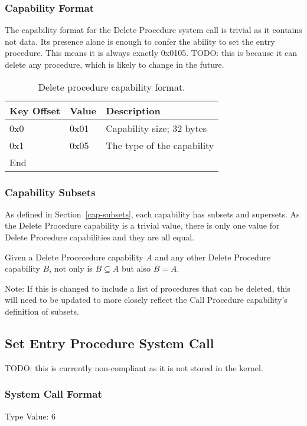\documentclass[english,a4paper]{article}
\let\oldparagraph\subsubsection
\renewcommand{\subsubsection}[1]{\oldparagraph{#1}\mbox{}}
\begin{document}
\subsubsection{Capability Format}
The capability format for the Delete Procedure system call is trivial as it
contains not data. Its presence alone is enough to confer the ability to set the
entry procedure. This means it is always exactly 0x0105. TODO: this is because
it can delete any procedure, which is likely to change in the future.

\begin{table}[H]
  \caption{Delete procedure capability format.}
  \centering{}%
  \begin{tabular}{l|l|p{}}
    \hline
    Key Offset & Value & Description\tabularnewline
    \hline
    \hline
    0x0 & 0x01 & Capability size; 32 bytes \tabularnewline
    0x1 & 0x05 & The type of the capability \tabularnewline
    \hline
    End &  \tabularnewline
    \hline
  \end{tabular}
\end{table}

\subsubsection{Capability Subsets}
As defined in Section~\ref{cap-subsets}, each capability has subsets and
supersets. As the Delete Procedure capability is a trivial value, there is only
one value for Delete Procedure capabilities and they are all equal.

Given a Delete Procecedure capability $A$ and any other Delete Procedure
capability $B$, not only is $B \subseteq A$ but also $B = A$.

Note: If this is changed to include a list of procedures that can be deleted,
this will need to be updated to more closely reflect the Call Procedure
capability's definition of subsets.

\subsection{Set Entry Procedure System Call}
TODO: this is currently non-compliant as it is not stored in the kernel.

\subsubsection{System Call Format}

Type Value: 6
\end{document}
